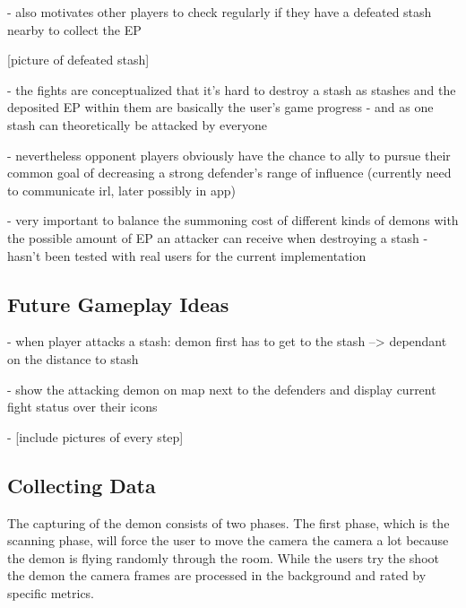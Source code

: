 - also motivates other players to check regularly if they have a defeated stash nearby to collect the EP

[picture of defeated stash]

- the fights are conceptualized that it's hard to destroy a stash as stashes and the deposited EP within them are basically the user's game progress
- and as one stash can theoretically be attacked by everyone

- nevertheless opponent players obviously have the chance to ally to pursue their common goal of decreasing a strong defender's range of influence (currently need to communicate irl, later possibly in app)

- very important to balance the summoning cost of different kinds of demons with the possible amount of EP an attacker can receive when destroying a stash
- hasn't been tested with real users for the current implementation

\subsection{Future Gameplay Ideas}
\label{subsec:futuregameplayideas}

- when player attacks a stash: demon first has to get to the stash --> dependant on the distance to stash 

- show the attacking demon on map next to the defenders and display current fight status over their icons


- [include pictures of every step]

\subsection{Collecting Data}
\label{subsec:collectingdata}

The capturing of the demon consists of two phases.
The first phase, which is the scanning phase, will force the user to move the camera the camera a lot because the demon is flying randomly through the room.
While the users try the shoot the demon the camera frames are processed in the background and rated by specific metrics.


